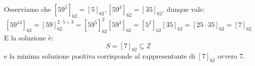 \begin{tcolorbox}[enhanced, breakable, colback=blue!30, colframe=blue!30!black, title=Esempio]
Osserviamo che $[59^5]_{62}=[5]_{62}, [59^3]_{62}=[35]_{62}$, dunque
vale:
\[ [59^{13}]_{62}=[59]^{2\cdot5+3}_{62}=[59^5]^2_{62}[59^3]_{62}=[5^2]_{62}[35]_{62}=[25\cdot35]_{62}=[7]_{62} \]
E la soluzione è:
\[ S=[7]_{62}\subseteq\mathbb{Z} \]
e la minima soluzione positiva corrisponde al rappresentante di $[7]_{62}$
ovvero 7.
\end{tcolorbox}